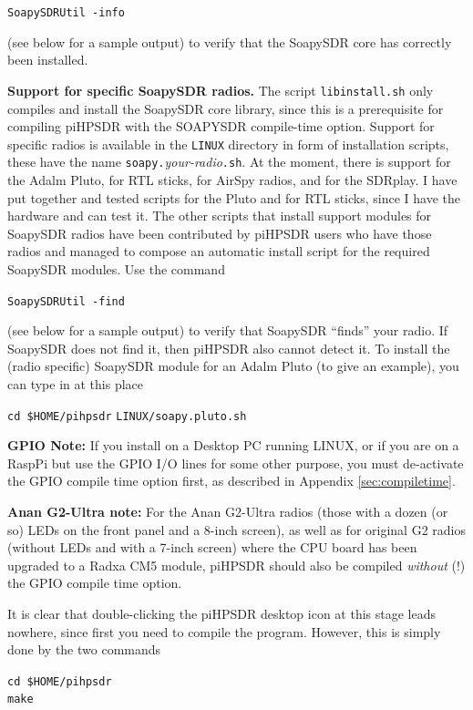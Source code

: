 \documentclass[12pt]{book}
\def\grtt#1{\texttt{\color{magenta}#1}}
\def\pH{pi\-HPSDR\xspace}
\begin{document}
\grtt{SoapySDRUtil -info}

(see below for a sample output) to
verify that the SoapySDR core has correctly been installed.

\textbf{\color{red}Support for specific SoapySDR radios.} The script \texttt{libinstall.sh} only compiles
and install the SoapySDR core library, since this is a prerequisite for compiling \pH with
the SOAPYSDR compile-time option. Support for specific radios is available in the \texttt{LINUX}
directory in form of installation scripts, these have the name \texttt{soapy.}\textit{your-radio}\texttt{.sh}.
At the moment, there is support for the Adalm Pluto, for RTL sticks, for AirSpy radios, and
for the SDRplay. I have put together and tested scripts for the Pluto and for RTL sticks,
since I have the hardware and can test it. The other scripts that install support modules
for SoapySDR radios have been contributed by \pH users who have those radios and managed
to compose an automatic install script for the required SoapySDR modules. Use the command

\grtt{SoapySDRUtil -find}

(see below for a sample output) to verify that SoapySDR
``finds'' your radio. If SoapySDR does not find it, then \pH also cannot detect it.
To install the (radio specific) SoapySDR module for an Adalm Pluto (to give an example),
 you can type in at this place

\grtt{cd \$HOME/pihpsdr}
\grtt{LINUX/soapy.pluto.sh}

\bigskip

\textbf{\color{red} GPIO Note:} If you install on a Desktop PC running LINUX, or if you are on a RaspPi but use
the GPIO I/O lines for some other purpose, you must de-activate the GPIO compile time option
first, as described in Appendix \ref{sec:compiletime}.

\textbf{\color{red}Anan G2-Ultra note:} For the Anan G2-Ultra radios (those with a dozen (or so) LEDs on
the front panel and a 8-inch screen), as well as for original G2 radios (without LEDs and with a 7-inch screen)
where the CPU board has been upgraded to a Radxa CM5 module, \pH should also be compiled \textit{without} (!) the
GPIO compile time option.

\bigskip

It is clear that double-clicking the \pH desktop icon at this stage leads nowhere,
since first you need to compile the program.
However,
this is simply done by the two commands

\grtt{cd \$HOME/pihpsdr} \\
\grtt{make}
\end{document}
